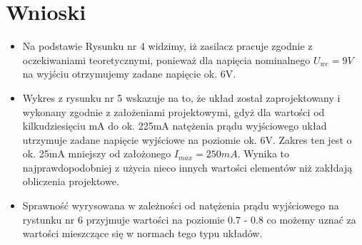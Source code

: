 \documentclass[a4paper,12pt]{article}
\begin{document}


\section {Wnioski}

\begin{itemize}
  \item Na podstawie Rysunku nr 4 widzimy, iż zasilacz pracuje zgodnie z oczekiwaniami teoretycznymi, ponieważ dla 
	napięcia nominalnego $U_{we} = 9V$ na wyjściu otrzymujemy zadane napięcie ok. 6V.
  \item Wykres z rysunku nr 5 wskazuje na to, że układ został zaprojektowany i wykonany zgodnie z założeniami
	projektowymi, gdyż dla wartości od kilkudziesięciu mA do ok. 225mA natężenia prądu wyjściowego 
	układ utrzymuje zadane napięcie wyjściowe na poziomie ok. 6V. Zakres ten jest o ok. 25mA mniejszy
	od założonego $I_{max} = 250mA$. Wynika to najprawdopodobniej z użycia nieco innych wartości
	elementów niż zakłdają obliczenia projektowe.
  \item Sprawność wyrysowana w zależności od natężenia prądu wyjściowego na rystunku nr 6 przyjmuje 
	wartości na poziomie 0.7 - 0.8 co możemy uznać za wartości mieszczące się w normach tego typu układów.
\end{itemize}
\end{document}
